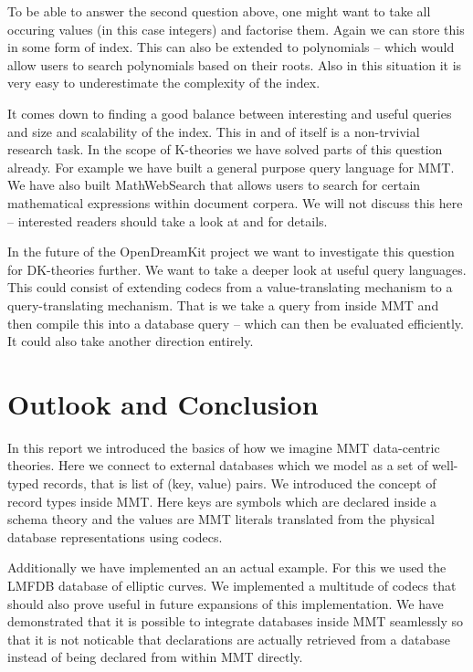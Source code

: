 \documentclass{deliverablereport}
\begin{document}
To be able to answer the second question above, one might want to take all occuring values (in this case integers) and factorise them. Again we can store this in some form of index. This can also be extended to polynomials -- which would allow users to search polynomials based on their roots. Also in this situation it is very easy to underestimate the complexity of the index.

It comes down to finding a good balance between interesting and useful queries and size and scalability of the index. This in and of itself is a non-trvivial research task. In the scope of K-theories we have solved parts of this question already. For example we have built a general purpose query language for MMT. We have also built MathWebSearch that allows users to search for certain mathematical expressions within document corpera. We will not discuss this here -- interested readers should take a look at \cite{Rabe:qlfml12} and \cite{ODK-D6.1} for details.

In the future of the OpenDreamKit project we want to investigate this question for DK-theories further. We want to take a deeper look at useful query languages. This could consist of extending codecs from a value-translating mechanism to a query-translating mechanism. That is we take a query from inside MMT and then compile this into a database query -- which can then be evaluated efficiently. It could also take another direction entirely.

\section{Outlook and Conclusion}\label{sec:conclusion}

In this report we introduced the basics of how we imagine MMT data-centric theories. Here we connect to external databases which we model as a set of well-typed records, that is list of (key, value) pairs. We introduced the concept of record types inside MMT. Here keys are symbols which are declared inside a schema theory and the values are MMT literals translated from the physical database representations using codecs.

Additionally we have implemented an an actual example. For this we used the LMFDB database of elliptic curves. We implemented a multitude of codecs that should also prove useful in future expansions of this implementation. We have demonstrated that it is possible to integrate databases inside MMT seamlessly so that it is not noticable that declarations are actually retrieved from a database instead of being declared from within MMT directly.
\end{document}
